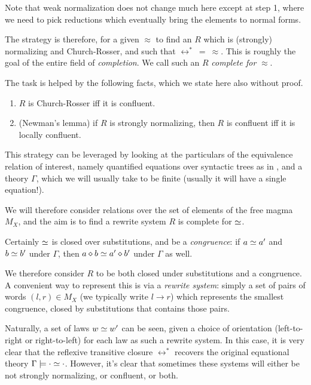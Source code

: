 Note that weak normalization does not change much here except at step 1, where we need to pick reductions which eventually bring the elements to normal forms.

The strategy is therefore, for a given $\approx$ to find an $R$ which is (strongly) normalizing and Church-Rosser, and such that $\leftrightarrow^*\ =\ \approx$. This is roughly the goal of the entire field of \emph{completion}. We call such an $R$ \emph{complete for} $\approx$.

The task is helped by the following facts, which we state here also without proof.

\begin{theorem}
  \begin{enumerate}
    \item $R$ is Church-Rosser iff it is confluent.
    \item (Newman's lemma) if $R$ is strongly normalizing, then $R$ is confluent iff it is locally confluent.
  \end{enumerate}
\end{theorem}

This strategy can be leveraged by looking at the particulars of the equivalence relation of interest, namely quantified equations over syntactic trees as in , and a theory $\Gamma$, which we will usually take to be finite (usually it will have a single equation!).

We will therefore consider relations over the set of elements of the free magma $M_{X}$, and the aim is to find a rewrite system $R$ is complete for $\simeq$.

Certainly $\simeq$ is closed over substitutions, and be a \emph{congruence}: if $a\simeq a'$ and $b\simeq b'$ under $\Gamma$, then $a\diamond b\simeq a'\diamond b'$ under $\Gamma$ as well.

We therefore consider $R$ to be both closed under substitutions and a congruence. A convenient way to represent this is via a \emph{rewrite system}: simply a set of pairs of words $(l, r) \in M_{X}$ (we typically write $l\rightarrow r$) which represents the smallest congruence, closed by substitutions that contains those pairs.

Naturally, a set of laws $w \simeq w'$ can be seen, given a choice of orientation (left-to-right or right-to-left) for each law as such a rewrite system. In this case, it is very clear that the reflexive transitive closure $\leftrightarrow^*$ recovers the original equational theory $\Gamma\models \cdot\simeq\cdot$. However, it's clear that sometimes these systems will either be not strongly normalizing, or confluent, or both.

